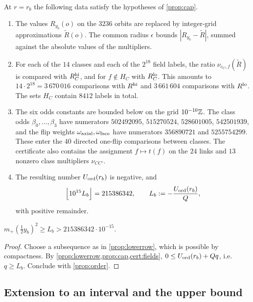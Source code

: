\begin{certificate}\label{cert:fields}
At $r=r_b$ the following data satisfy the hypotheses of \cref{prop:cap}.
\begin{enumerate}[label=\textup{(\alph*)}]
\item The values $R_{y_b}(o)$ on the $3236$ orbits are replaced by integer-grid approximations $\widetilde R(o)$. The common radius $\epsilon$ bounds $|R_{y_b}-\widetilde R|$, summed against the absolute values of the multipliers.
\item For each of the $14$ classes and each of the $2^{18}$ field labels, the ratio $\nu_{c_C,f}(\widetilde R)$ is compared with $R^{\rm hi}_C$, and for $f\notin H_C$ with $R^{\rm lo}_C$. This amounts to $14\cdot2^{18}=3\,670\,016$ comparisons with $R^{\rm hi}$ and $3\,661\,604$ comparisons with $R^{\rm lo}$. The sets $H_C$ contain $8412$ labels in total.
\item The six odds constants are bounded below on the grid $10^{-10}\mathbb Z$. The class odds $\beta_0,\dots,\beta_3$ have numerators $502492095$, $515270524$, $528601005$, $542501939$, and the flip weights $\omega_{\rm axial},\omega_{\rm face}$ have numerators $356890721$ and $5255754299$. These enter the $40$ directed one-flip comparisons between classes. The certificate also contains the assignment $f\mapsto t(f)$ on the $24$ links and $13$ nonzero class multipliers $\nu_{CC'}$.
\item The resulting number $U_{\mathrm{ord}}(r_b)$ is negative, and
\[
 \Bigl\lfloor10^{15}L_b\Bigr\rfloor=215386342,\qquad L_b:=-\frac{U_{\mathrm{ord}}(r_b)}{Q},
\]
with positive remainder.
\end{enumerate}
\end{certificate}

\begin{proposition}\label{prop:rb}
$m_+(\tfrac12y_b)^2\ge L_b>215386342\cdot10^{-15}$.
\end{proposition}

\begin{proof}
Choose a subsequence as in \cref{prop:lowerrow}, which is possible by compactness. By \cref{prop:lowerrow,prop:cap,cert:fields}, $0\le U_{\mathrm{ord}}(r_b)+Qq$, i.e.\ $q\ge L_b$. Conclude with \cref{prop:order}.
\end{proof}

\subsection{Extension to an interval and the upper bound}

